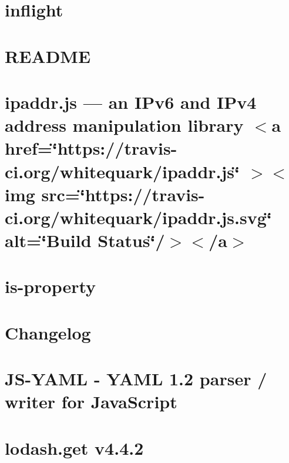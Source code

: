 \documentclass[twoside]{book}
\newcommand{\+}{\discretionary{\mbox{\scriptsize$\hookleftarrow$}}{}{}}
\begin{document}
\chapter{inflight}
\label{md_Backend_nodejs_node_modules_inflight_README}

\chapter{README}
\label{md_Backend_nodejs_node_modules_inherits_README}

\chapter{ipaddr.\+js — an IPv6 and IPv4 address manipulation library \texorpdfstring{$<$}{<}a href=\char`\"{}https\+://travis-\/ci.\+org/whitequark/ipaddr.\+js\char`\"{} \texorpdfstring{$>$}{>}\texorpdfstring{$<$}{<}img src=\char`\"{}https\+://travis-\/ci.\+org/whitequark/ipaddr.\+js.\+svg\char`\"{} alt=\char`\"{}\+Build Status\char`\"{}/\texorpdfstring{$>$}{>}\texorpdfstring{$<$}{<}/a\texorpdfstring{$>$}{>}}
\label{md_Backend_nodejs_node_modules_ipaddr_js_README}

\chapter{is-\/property}
\label{md_Backend_nodejs_node_modules_is_property_README}

\chapter{Changelog}
\label{md_Backend_nodejs_node_modules_js_yaml_CHANGELOG}

\chapter{JS-\/\+YAML -\/ YAML 1.2 parser / writer for Java\+Script}
\label{md_Backend_nodejs_node_modules_js_yaml_README}

\chapter{lodash.\+get v4.4.2}
\label{md_Backend_nodejs_node_modules_lodash_get_README}

\end{document}
